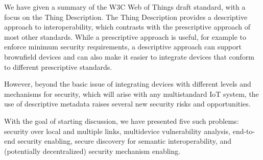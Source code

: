 We have given a summary of the W3C Web of Things draft
standard, with a focus on the Thing Description.
The Thing Description provides a descriptive approach to 
interoperability, which contrasts with the prescriptive
approach of most other standards.
While a prescriptive approach is useful, for example to
enforce minimum security requirements,
a descriptive approach can support brownfield devices
and can also make it easier to integrate devices that
conform to different prescriptive standards.

However, beyond the basic issue of integrating devices
with different levels and mechanisms for security,
which will arise with any multistandard IoT system,
the use of descriptive metadata raises several
new security risks and opportunities.  

With the goal of starting discussion,
we have presented five such problems: 
security over local and multiple links,
multidevice vulnerability analysis,
end-to-end security enabling,
secure discovery for semantic interoperability,
and (potentially decentralized) security mechanism enabling.
